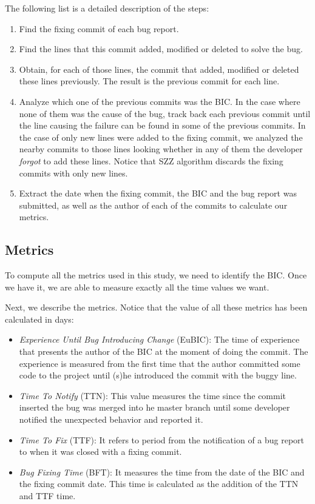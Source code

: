 \documentclass[10pt, conference]{IEEEtran}
\begin{document}
The following list is a detailed description of the steps: 

\begin{enumerate}
		\item Find the fixing commit of each bug report.
		\item Find the lines that this commit added, modified or deleted to solve the bug.
		\item Obtain, for each of those lines, the commit that added, modified or deleted these lines previously. The result is the previous commit for each line.
		\item Analyze which one of the previous commits was the BIC. In the case where none of them was the cause of the bug, track back each previous commit until the line causing the failure can be found in some of the previous commits. In the case of only new lines were added to the fixing commit, we analyzed the nearby commits to those lines looking whether in any of them the developer \emph{forgot} to add these lines. Notice that SZZ algorithm discards the fixing commits with only new lines.
		\item Extract the date when the fixing commit, the BIC and the bug report was submitted, as well as the author of each of the commits to calculate our metrics.	
\end{enumerate} 


\subsection{Metrics}

To compute all the metrics used in this study, we need to identify the BIC. Once we have it, we are able to measure exactly all the time values we want.  

Next, we describe the metrics. Notice that the value of all these metrics has been calculated in days: 

\begin{itemize}
		\item \emph{Experience Until Bug Introducing Change} (EuBIC): The time of experience that presents the author of the BIC at the moment of doing the commit. The experience is measured from the first time that the author committed some code to the project until (s)he introduced the commit with the buggy line.
		\item \emph{Time To Notify} (TTN): This value measures the time since the commit inserted the bug was merged into he master branch until some developer notified the unexpected behavior and reported it. 
		\item \emph{Time To Fix} (TTF): It refers to period from the notification of a bug report to when it was closed with a fixing commit.
		\item \emph{Bug Fixing Time} (BFT): It measures the time from the date of the BIC and the fixing commit date. This time is calculated as the addition of the TTN and TTF time.
\end{itemize} 
\end{document}
